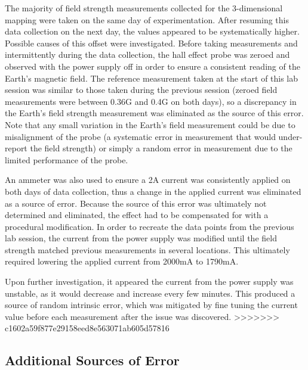 \documentclass[a4paper]{article}
\begin{document}
\qq The majority of field strength measurements collected for the 3-dimensional
mapping were taken on the same day of experimentation. After resuming this data
collection on the next day, the values appeared to be systematically
higher. Possible causes of this offset were investigated. Before taking
measurements and intermittently during the data collection, the hall effect
probe was zeroed and observed with the power supply off in order to ensure a
consistent reading of the Earth's magnetic field. The reference measurement
taken at the start of this lab session was similar to those taken during the
previous session (zeroed field measurements were between 0.36G and 0.4G on both
days), so a discrepancy in the Earth's field strength measurement was eliminated
as the source of this error. Note that any small variation in the Earth's field
measurement could be due to misalignment of the probe (a systematic error in
measurement that would under-report the field strength) or simply a random error
in measurement due to the limited performance of the probe.

\qq An ammeter was also used to ensure a 2A current was consistently applied on both
days of data collection, thus a change in the applied current was eliminated as
a source of error. Because the source of this error was ultimately not
determined and eliminated, the effect had to be compensated for with a
procedural modification. In order to recreate the data points from the previous
lab session, the current from the power supply was modified until the field
strength matched previous measurements in several locations. This ultimately
required lowering the applied current from 2000mA to 1790mA.

\qq Upon further investigation, it appeared the current from the power supply was
unstable, as it would decrease and increase every few minutes. This produced a
source of random intrinsic error, which was mitigated by fine tuning the current
value before each measurement after the issue was discovered.
>>>>>>> c1602a59f877e29158eed8e563071ab605d57816

\subsection{Additional Sources of Error}
\end{document}
